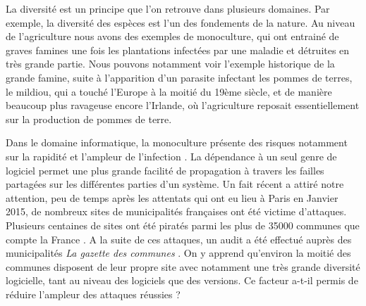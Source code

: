 La diversité est un principe que l'on retrouve dans plusieurs domaines. Par exemple, la diversité des espèces est l’un des fondements de la nature. Au niveau de l’agriculture nous avons des exemples de monoculture, qui ont entrainé de graves famines une fois les plantations infectées par une maladie et détruites en très grande partie. Nous pouvons notamment voir l’exemple historique de la grande famine, suite à l’apparition d’un parasite infectant les pommes de terres, le mildiou, qui a touché l’Europe à la moitié du 19ème siècle, et de manière beaucoup plus ravageuse encore l'Irlande, où l’agriculture reposait essentiellement sur la production de pommes de terre.

Dans le domaine informatique, la monoculture présente des risques notamment sur la rapidité et l’ampleur de l’infection \cite{risksOfMonoculture}. La dépendance à un seul genre de logiciel permet une plus grande facilité de propagation à travers les failles partagées sur les différentes parties d'un système.
Un fait récent a attiré notre attention, peu de temps après les attentats qui ont eu lieu à Paris en Janvier 2015, de nombreux sites de municipalités françaises ont été victime d’attaques. Plusieurs centaines de sites ont été piratés parmi les plus de 35000 communes que compte la France \cite{communes_INSEE}. A la suite de ces attaques, un audit a été effectué auprès des municipalités \textit{La gazette des communes} . On y apprend qu’environ la moitié des communes disposent de leur propre site avec notamment une très grande diversité logicielle, tant au niveau des logiciels que des versions. Ce facteur a-t-il permis de réduire l’ampleur des attaques réussies ?

